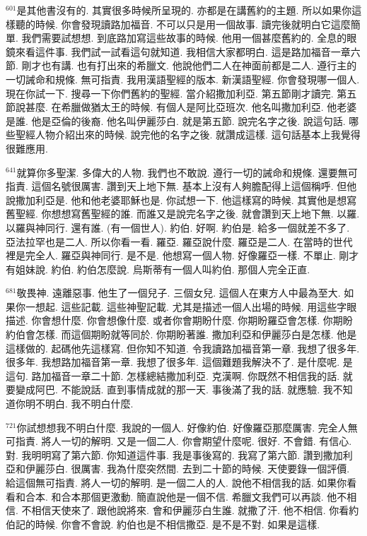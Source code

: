 \documentclass{book}
\begin{document}
$^{601}$是其他書沒有的.
其實很多時候所呈現的.
亦都是在講舊約的主題.
所以如果你這樣聽的時候.
你會發現讀路加福音.
不可以只是用一個故事.
讀完後就明白它這麼簡單.
我們需要試想想.
到底路加寫這些故事的時候.
他用一個甚麼舊約的.
全息的眼鏡來看這件事.
我們試一試看這句就知道.
我相信大家都明白.
這是路加福音一章六節.
剛才也有講.
也有打出來的希臘文.
他說他們二人在神面前都是二人.
遵行主的一切誡命和規條.
無可指責.
我用漢語聖經的版本.
新漢語聖經.
你會發現哪一個人.
現在你試一下.
搜尋一下你們舊約的聖經.
當介紹撒加利亞.
第五節剛才讀完.
第五節說甚麼.
在希臘做猶太王的時候.
有個人是阿比亞班次.
他名叫撒加利亞.
他老婆是誰.
他是亞倫的後裔.
他名叫伊麗莎白.
就是第五節.
說完名字之後.
說這句話.
哪些聖經人物介紹出來的時候.
說完他的名字之後.
就讚成這樣.
這句話基本上我覺得很難應用.

$^{641}$就算你多聖潔.
多偉大的人物.
我們也不敢說.
遵行一切的誡命和規條.
還要無可指責.
這個名號很厲害.
讚到天上地下無.
基本上沒有人夠膽配得上這個稱呼.
但他說撒加利亞是.
他和他老婆耶穌也是.
你試想一下.
他這樣寫的時候.
其實他是想寫舊聖經.
你想想寫舊聖經的誰.
而誰又是說完名字之後.
就會讚到天上地下無.
以羅.
以羅與神同行.
還有誰.
(有一個世人).
約伯.
好啊.
約伯是.
給多一個就差不多了.
亞法拉罕也是二人.
所以你看一看.
羅亞.
羅亞說什麼.
羅亞是二人.
在當時的世代裡是完全人.
羅亞與神同行.
是不是.
他想寫一個人物.
好像羅亞一樣.
不單止.
剛才有姐妹說.
約伯.
約伯怎麼說.
烏斯蒂有一個人叫約伯.
那個人完全正直.

$^{681}$敬畏神.
遠離惡事.
他生了一個兒子.
三個女兒.
這個人在東方人中最為至大.
如果你一想起.
這些記載.
這些神聖記載.
尤其是描述一個人出場的時候.
用這些字眼描述.
你會想什麼.
你會想像什麼.
或者你會期盼什麼.
你期盼羅亞會怎樣.
你期盼約伯會怎樣.
而這個期盼就等同於.
你期盼著誰.
撒加利亞和伊麗莎白是怎樣.
他是這樣做的.
起碼他先這樣寫.
但你知不知道.
令我讀路加福音第一章.
我想了很多年.
很多年.
我想路加福音第一章.
我想了很多年.
這個難題我解決不了.
是什麼呢.
是這句.
路加福音一章二十節.
怎樣總結撒加利亞.
克漢啊.
你既然不相信我的話.
就要變成阿巴.
不能說話.
直到事情成就的那一天.
事後滿了我的話.
就應驗.
我不知道你明不明白.
我不明白什麼.

$^{721}$你試想想我不明白什麼.
我說的一個人.
好像約伯.
好像羅亞那麼厲害.
完全人無可指責.
將人一切的解明.
又是一個二人.
你會期望什麼呢.
很好.
不會錯.
有信心.
對.
我明明寫了第六節.
你知道這件事.
我是事後寫的.
我寫了第六節.
讚到撒加利亞和伊麗莎白.
很厲害.
我為什麼突然間.
去到二十節的時候.
天使要錄一個評價.
給這個無可指責.
將人一切的解明.
是一個二人的人.
說他不相信我的話.
如果你看看和合本.
和合本那個更激動.
簡直說他是一個不信.
希臘文我們可以再談.
他不相信.
不相信天使來了.
跟他說將來.
會和伊麗莎白生誰.
就撒了汗.
他不相信.
你看約伯記的時候.
你會不會說.
約伯也是不相信撒亞.
是不是不對.
如果是這樣.
\end{document}
